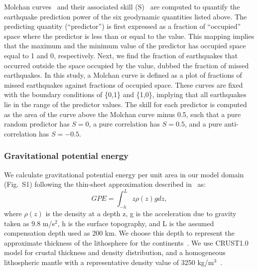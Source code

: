 \documentclass[draft,linenumbers]{agujournal2018}
\begin{document}
Molchan curves~\citep{molchan1990strategies, molchan1991structure} and their associated skill (S)~\citep{becker2015western} are computed to quantify the earthquake prediction power of the six geodynamic quantities listed above. The predicting quantity (``predictor'') is first expressed as a fraction of ``occupied'' space where the predictor is less than or equal to the value. This mapping implies that the maximum and the minimum value of the predictor has occupied space equal to 1 and 0, respectively. Next, we find the fraction of earthquakes that occurred outside the space occupied by the value, dubbed the fraction of missed earthquakes. In this study, a Molchan curve is defined as a plot of fractions of missed earthquakes against fractions of occupied space. 
These curves are fixed with the boundary conditions of \{0,1\} and \{1,0\}, implying that all earthquakes lie in the range of the predictor values. The skill for each predictor is computed as the area of the curve above the Molchan curve minus 0.5, such that a pure random predictor has $S=0$, a pure correlation has $S=0.5$, and a pure anti-correlation has $S=-0.5$. 

\subsubsection{Gravitational potential energy}
We calculate gravitational potential energy per unit area in our model domain (Fig.~S1) following the thin-sheet approximation described in~\citet{ghosh2009contribution} as:
\begin{equation}\label{eq3}
GPE = \int_{-h}^{L} z \rho(z) g dz,
\end{equation}
where $\rho(z)$ is the density at a depth z, g is the acceleration due to gravity taken as 9.8 m/s$^2$, h is the surface topography, and L is the assumed compensation depth used as 200 km. We choose this depth to represent the approximate thickness of the lithosphere for the continents~\citep{mckenzie2005thermal}. We use CRUST1.0~\citep{laske2013update} model for crustal thickness and density distribution, and a homogeneous lithospheric mantle with a representative density value of 3250 kg/m$^3$~\citep{becker2014static}. 
\end{document}
